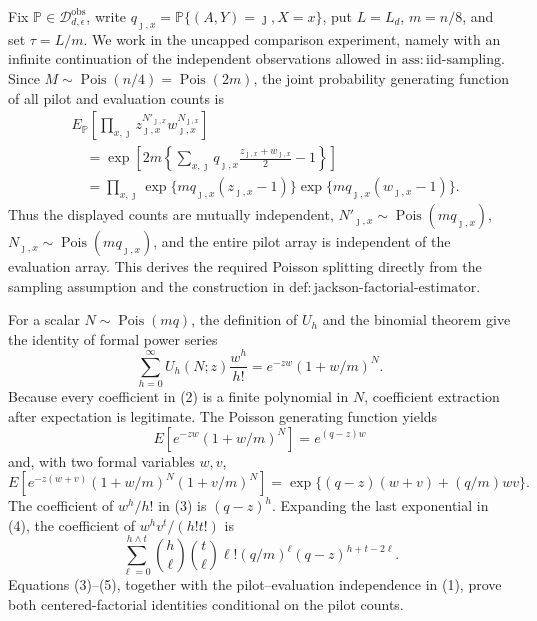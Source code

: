 Fix \(\mathbb P\in\mathcal D_{d,\epsilon}^{\mathrm{obs}}\), write \(q_{\jmath,x}=\mathbb P\{(A,Y)=\jmath,X=x\}\), put \(L=L_d\), \(m=n/8\), and set \(\tau=L/m\).  We work in the uncapped comparison experiment, namely with an infinite continuation of the independent observations allowed in \(\mathrm{ass:iid\mbox{-}sampling}\).  Since \(M\sim\operatorname{Pois}(n/4)=\operatorname{Pois}(2m)\), the joint probability generating function of all pilot and evaluation counts is
\[
 \begin{split}
 &E_{\mathbb P}\!\left[
   \prod_{x,\jmath}z_{\jmath,x}^{N'_{\jmath,x}}
                      w_{\jmath,x}^{N_{\jmath,x}}
 \right]\\
 &\quad=\exp\!\left[
 2m\left\{\sum_{x,\jmath}q_{\jmath,x}
       \frac{z_{\jmath,x}+w_{\jmath,x}}2-1\right\}
 \right]\\
 &\quad=\prod_{x,\jmath}
   \exp\{mq_{\jmath,x}(z_{\jmath,x}-1)\}
   \exp\{mq_{\jmath,x}(w_{\jmath,x}-1)\}.
 \end{split}                                                     \tag{1}
\]
Thus the displayed counts are mutually independent, \(N'_{\jmath,x}\sim\operatorname{Pois}(mq_{\jmath,x})\), \(N_{\jmath,x}\sim\operatorname{Pois}(mq_{\jmath,x})\), and the entire pilot array is independent of the evaluation array.  This derives the required Poisson splitting directly from the sampling assumption and the construction in \(\mathrm{def:jackson\mbox{-}factorial\mbox{-}estimator}\).

For a scalar \(N\sim\operatorname{Pois}(mq)\), the definition of \(U_h\) and the binomial theorem give the identity of formal power series
\[
 \sum_{h=0}^{\infty}U_h(N;z)\frac{w^h}{h!}
 =e^{-zw}(1+w/m)^N.                                                \tag{2}
\]
Because every coefficient in (2) is a finite polynomial in \(N\), coefficient extraction after expectation is legitimate.  The Poisson generating function yields
\[
 E[e^{-zw}(1+w/m)^N]=e^{(q-z)w}                                   \tag{3}
\]
and, with two formal variables \(w,v\),
\[
 E\!\left[e^{-z(w+v)}(1+w/m)^N(1+v/m)^N\right]
 =\exp\{(q-z)(w+v)+(q/m)wv\}.                                    \tag{4}
\]
The coefficient of \(w^h/h!\) in (3) is \((q-z)^h\).  Expanding the last exponential in (4), the coefficient of \(w^hv^t/(h!t!)\) is
\[
 \sum_{\ell=0}^{h\wedge t}
 \binom h\ell\binom t\ell\ell!(q/m)^\ell
 (q-z)^{h+t-2\ell}.                                               \tag{5}
\]
Equations (3)--(5), together with the pilot--evaluation independence in (1), prove both centered-factorial identities conditional on the pilot counts.


